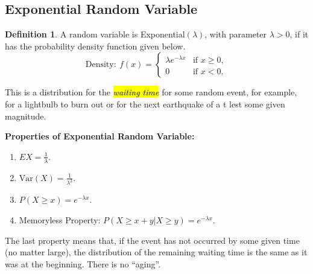 \documentclass[12pt,a4paper]{article}
\theoremstyle{definition}
\theoremstyle{definition}
\newtheorem*{definition}{Definition}
\theoremstyle{definition}
\theoremstyle{definition}
\theoremstyle{remark}
\theoremstyle{definition}
\newcommand{\dispsty}{\displaystyle}
\newcommand{\Var}{\text{Var}}
\begin{document}
\subsection{Exponential Random Variable}
\begin{tcolorbox}[colback=white]
	\begin{definition}
		A random variable is Exponential$(\lambda)$, with parameter $\lambda>0$, if it has the probability density function given below. \[
		\text{Density}:\ f(x)=\begin{cases}
		\lambda e^{-\lambda x} &\text{if $x\geq 0$},\\
		0 &\text{if $x<0$}.
		\end{cases}
		\]
	\end{definition}
\end{tcolorbox} This is a distribution for the \hl{\textit{waiting time}} for some random event, for example, for a lightbulb to burn out or for the next earthquake of a t lest some given magnitude.
\\
\begin{tcolorbox}[colback=white]
	\textbf{Properties of Exponential Random Variable:}\begin{enumerate}
		\item $\dispsty EX=\frac{1}{\lambda}$.
		\item $\dispsty \Var(X)=\frac{1}{\lambda^2}$.
		\item $\dispsty P(X\geq x)=e^{-\lambda x}$.
		\item Memoryless Property: $\dispsty P(X\geq x+y|X\geq y)=e^{-\lambda x}$.
	\end{enumerate}
\end{tcolorbox} The last property means that, if the event has not occurred by some given time (no matter large), the distribution of the remaining waiting time is the same as it was at the beginning. There is no ``aging''.
\end{document}
